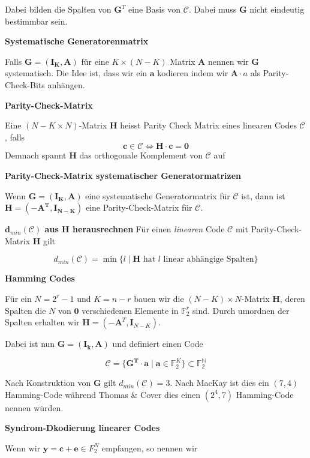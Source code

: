 \documentclass[25pt]{sciposter}
\newcommand{\C}{\mathcal{C}}
\newenvironment{defn}[1]{\begin{mdframed}[backgroundcolor=blue!10,innertopmargin=15pt, nobreak=true,innerbottommargin=15pt]
		\textbf{#1 }
	}
	{ 
	\end{mdframed}
}
\newenvironment{thm}[1]{\begin{mdframed}[nobreak=true,backgroundcolor=Emerald!10,innertopmargin=15pt, innerbottommargin=15pt]
		\textbf{#1 }
	}
	{ 
	\end{mdframed}
}
\begin{document}
\begin{multicols}{3}
Dabei bilden die Spalten von $\mathbf{G}^T$ eine Basis von $\C$. Dabei muss $\mathbf{G}$ nicht eindeutig bestimmbar sein.

\begin{defn}{Systematische Generatorenmatrix}
	Falls $\mathbf{G = (I_K,A)}$ für eine $K\times (N-K)$ Matrix $\mathbf{A}$ nennen wir $\mathbf{G}$ systematisch. Die Idee ist, dass wir ein $\mathbf{a}$ kodieren indem wir $\mathbf{A}\cdot a$ als Parity-Check-Bits anhängen.
\end{defn}

\begin{defn}{Parity-Check-Matrix}
	Eine $(N-K\times N)$-Matrix $\mathbf{H}$ heisst Parity Check Matrix eines linearen Codes $\C$, falls $$\mathbf{c} \in \C \iff \mathbf{H\cdot c = 0}$$ 
	Demnach spannt $\mathbf{H}$ das orthogonale Komplement von $\C$ auf
\end{defn}


\begin{thm}{Parity-Check-Matrix systematischer Generatormatrizen}
	Wenn $\mathbf{G = (I_K,A)}$ eine systematische Generatormatrix für $\C$ ist, dann ist $\mathbf{H = (-A^T,I_{N-K})}$ eine Parity-Check-Matrix für $\C$.
\end{thm}

\begin{thm}{$\mathbf d_{min}(\C)$ aus $\mathbf{H}$ herausrechnen} Für einen \textit{linearen} Code $\C$ mit Parity-Check-Matrix $\mathbf{H}$ gilt
	
	 $$d_{min}(\C) = \min \{l \mid \mathbf{H} \text{ hat $l$ linear abhängige Spalten} \}$$
\end{thm}


\begin{defn}{Hamming Codes}
	Für ein $N = 2^r-1$ und $K=n-r$ bauen wir die $(N-K)\times N$-Matrix $\mathbf{H}$, deren Spalten die $N$ von $\mathbf{0}$ verschiedenen Elemente in $\mathbb{F}_2^r$ sind. Durch umordnen der Spalten erhalten wir $\mathbf{H} = (-\mathbf{A}^T,\mathbf{I}_{N-K})$.
	
	Dabei ist nun $\mathbf{G = (I_k,A)}$ und definiert einen Code 
	
	$$\C = \{\mathbf{G^T\cdot a \mid a} \in \mathbb{F}_2^K\}\subset \mathbb{F_2^N}$$
	
	Nach Konstruktion von $\mathbf{G}$ gilt $d_{min}(\C) = 3$. Nach MacKay ist dies ein $(7,4)$ Hamming-Code während Thomas \& Cover dies einen $(2^4,7)$ Hamming-Code nennen würden.
\end{defn}

\begin{thm}{Syndrom-Dkodierung linearer Codes}
	Wenn wir $\mathbf{y = c+e}\in F_2^N$ empfangen, so nennen wir 
	

\end{thm}
\end{multicols}
\end{document}
